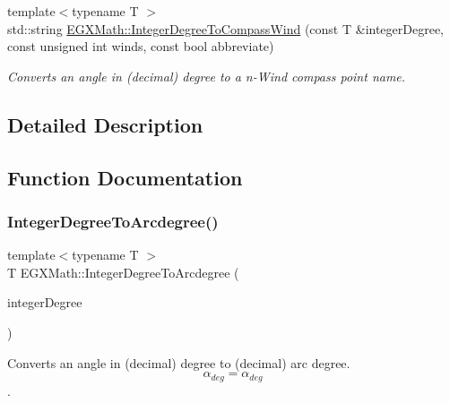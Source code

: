 \begin{DoxyCompactItemize}
{\footnotesize template$<$typename T $>$ }\\std\+::string \mbox{\hyperlink{group___e_g_x_math-_angle_conversions-_integer_degree_ga01abeefd29282a3c88d3d3c28fd2c6fa}{E\+G\+X\+Math\+::\+Integer\+Degree\+To\+Compass\+Wind}} (const T \&integer\+Degree, const unsigned int winds, const bool abbreviate)
\begin{DoxyCompactList}\small\item\em Converts an angle in (decimal) degree to a n-\/\+Wind compass point name. \end{DoxyCompactList}\end{DoxyCompactItemize}


\subsection{Detailed Description}


\subsection{Function Documentation}
\mbox{\label{group___e_g_x_math-_angle_conversions-_integer_degree_gaf633d0b82bfb7586ce86ffbcf78d8f7a}} 
\subsubsection{\texorpdfstring{Integer\+Degree\+To\+Arcdegree()}{IntegerDegreeToArcdegree()}}
{\footnotesize\ttfamily template$<$typename T $>$ \\
T E\+G\+X\+Math\+::\+Integer\+Degree\+To\+Arcdegree (\begin{DoxyParamCaption}\item[{const T \&}]{integer\+Degree }\end{DoxyParamCaption})}



Converts an angle in (decimal) degree to (decimal) arc degree. \[\alpha_{deg}=\alpha_{deg}\]. 

